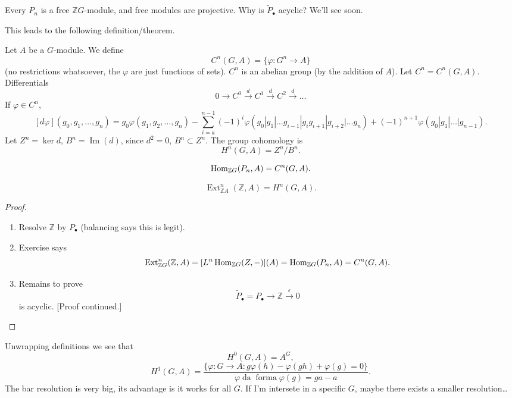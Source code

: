 \begin{remark}
\label{remark-bar}
Every $P_n$ is a free $\mathbb{Z}G$-module,
and free modules are projective.
Why is $\tilde{P}_\bullet$
acyclic? We'll see soon.
\end{remark}

\noindent
This leads to the following
definition/theorem.

\begin{definition}
\label{definition-group-cohomology}
Let $A$ be a $G$-module.
We define
$$
C^n(G,A)
=
\{\varphi:G^n\to A\}
$$
(no restrictions whatsoever, the $\varphi$
are just functions of sets).
$C^n$ is an abelian group (by the addition
of $A$). Let $C^n = C^n(G,A)$.
Differentials
$$
0\to C^0
\xrightarrow{d} C^1
\xrightarrow{d} C^2
\xrightarrow{d}…
$$
If $\varphi \in C^n$,
$$
[d\varphi](g_0,g_1,…,g_n)
=
g_0\varphi(g_1,g_2,…,g_n)
-
\sum_{i=a}^{n-1}
(-1)^i
\varphi(g_0|g_1|…g_{i-1}|g_ig_{i+1}|
g_{i+2}|…g_n)
+(-1)^{n+1}\varphi(g_0|g_1|…|g_{n-1}).
$$
Let $Z^n=\ker d$,
$B^n=\operatorname{Im}(d)$, since
$d^2=0$,  $B^n \subset Z^n$.
The group cohomology is
$$
H^n(G,A) = Z^n/B^n.
$$
\end{definition}

\begin{exercise}
\label{exercise-hom-group-cohom}
$$
\mathop{\mathrm{Hom}}\nolimits_{\mathbb{Z}G}(P_n,A)
=
C^n(G,A).
$$
\end{exercise}

\begin{theorem}
\label{theorem-ext-group-cohom}
$$
\operatorname{Ext}^n_{\mathbb{Z}A}(\mathbb{Z},A)
=
H^n(G,A).
$$
\end{theorem}

\begin{proof}
\begin{enumerate}
\item Resolve $\mathbb{Z}$ by 
$P_{\bullet}$ (balancing says this is
legit).

\item Exercise says
$$
\operatorname{Ext}^n_{\mathbb{Z}G}(\mathbb{Z},A)
=
[L^n\mathop{\mathrm{Hom}}\nolimits_{\mathbb{Z}G}(Z,-)](A)
=
\mathop{\mathrm{Hom}}\nolimits_{\mathbb{Z}G}(P_n,A)
=
C^n(G,A).
$$
\item Remains to prove
$$
\tilde{P}_\bullet=P_\bullet
\to \mathbb{Z}
\xrightarrow{\varepsilon}0
$$
is acyclic. [Proof continued.]
\end{enumerate}
\end{proof}

\noindent
Unwrapping definitions we see that
$$
H^0(G,A) = A^G,
$$
$$
H^1(G,A)
=
\frac{\{\varphi:G \to A:
g\varphi(h)-\varphi(gh)
+\varphi(g)=0\}}{
\varphi \operatorname{da}
\operatorname{forma}
\varphi(g)=ga-a}.
$$
The bar resolution is very big, its
advantage is it works for all $G$.
If I'm intersete in a specific $G$,
maybe there exists a smaller resolution…

